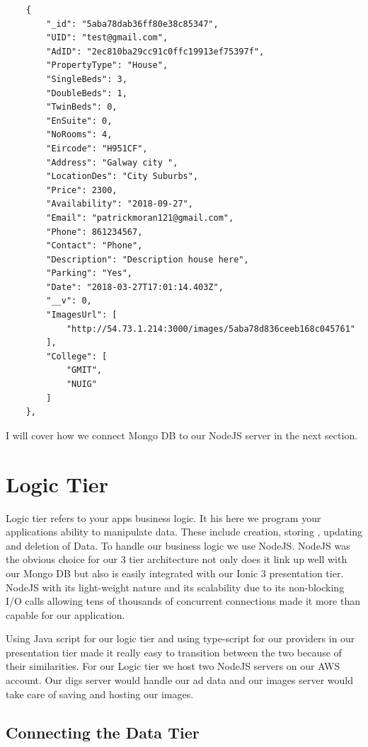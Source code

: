 \begin{verbatim}
    {
        "_id": "5aba78dab36ff80e38c85347",
        "UID": "test@gmail.com",
        "AdID": "2ec810ba29cc91c0ffc19913ef75397f",
        "PropertyType": "House",
        "SingleBeds": 3,
        "DoubleBeds": 1,
        "TwinBeds": 0,
        "EnSuite": 0,
        "NoRooms": 4,
        "Eircode": "H951CF",
        "Address": "Galway city ",
        "LocationDes": "City Suburbs",
        "Price": 2300,
        "Availability": "2018-09-27",
        "Email": "patrickmoran121@gmail.com",
        "Phone": 861234567,
        "Contact": "Phone",
        "Description": "Description house here",
        "Parking": "Yes",
        "Date": "2018-03-27T17:01:14.403Z",
        "__v": 0,
        "ImagesUrl": [
            "http://54.73.1.214:3000/images/5aba78d836ceeb168c045761"
        ],
        "College": [
            "GMIT",
            "NUIG"
        ]
    },
\end{verbatim}

I will cover how we connect Mongo DB to our NodeJS server in the next section.

\section{Logic Tier}

Logic tier refers to your apps business logic. It his here we program your applications ability to manipulate data. These include creation, storing , updating and deletion of Data. To handle our business logic we use NodeJS. NodeJS was the obvious choice for our 3 tier architecture not only does it link up well with our Mongo DB  but also is easily integrated with our Ionic 3 presentation tier. NodeJS with its light-weight nature and its scalability due to its non-blocking I/O calls allowing tens of thousands of concurrent connections made it more than capable for our application.

Using Java script for our logic tier and using type-script for our providers in our presentation tier made it really easy to transition between the two because of their similarities. For our Logic tier we host two NodeJS servers on our AWS account. Our digs server would handle our ad data and our images server would take care of saving and hosting our images.

\subsection{Connecting the Data Tier}

